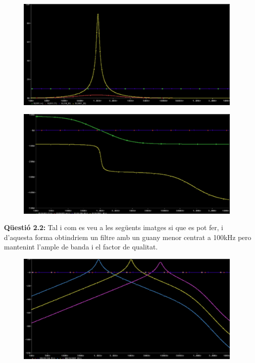 \documentclass[12pt, a4papre]{article}
\begin{document}
	\begin{figure}[H]
		\begin{center}
		\includegraphics[width=110mm]{2_1_2.png}
		\end{center}
	\end{figure}
	\begin{figure}[H]
		\begin{center}
		\includegraphics[width=110mm]{2_1_3.png}
		\end{center}
	\end{figure}
	
	\textbf{Qüestió 2.2:} Tal i com es veu a les següents imatges si que es pot fer, i d'aquesta forma obtindriem un filtre amb un guany menor centrat a 100kHz pero mantenint l'ample de banda i el factor de qualitat.
	
	\begin{figure}[H]
		\begin{center}
		\includegraphics[width=110mm]{2_2_1.png}
		\end{center}
	\end{figure}
	
\end{document}
